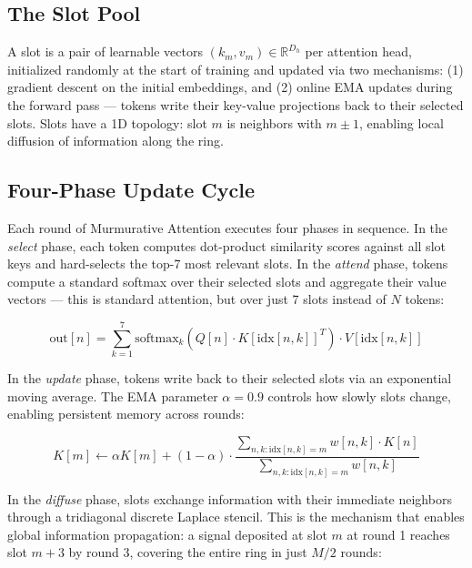 \documentclass{article}
\begin{document}
\subsection{The Slot Pool}

A slot is a pair of learnable vectors $(k_m, v_m) \in \mathbb{R}^{D_h}$ per attention head, initialized randomly at the start of training and updated via two mechanisms: (1) gradient descent on the initial embeddings, and (2) online EMA updates during the forward pass — tokens write their key-value projections back to their selected slots. Slots have a 1D topology: slot $m$ is neighbors with $m \pm 1$, enabling local diffusion of information along the ring.

\subsection{Four-Phase Update Cycle}

Each round of Murmurative Attention executes four phases in sequence. In the \textit{select} phase, each token computes dot-product similarity scores against all slot keys and hard-selects the top-7 most relevant slots. In the \textit{attend} phase, tokens compute a standard softmax over their selected slots and aggregate their value vectors — this is standard attention, but over just 7 slots instead of $N$ tokens:

\begin{equation}
\mathrm{out}[n] = \sum_{k=1}^{7} \mathrm{softmax}_k\!\left(Q[n] \cdot K[\mathrm{idx}[n,k]]^{T}\right) \cdot V[\mathrm{idx}[n,k]]
\label{eq:select-attend}
\end{equation}

In the \textit{update} phase, tokens write back to their selected slots via an exponential moving average. The EMA parameter $\alpha = 0.9$ controls how slowly slots change, enabling persistent memory across rounds:

\begin{equation}
K[m] \leftarrow \alpha K[m] + (1-\alpha) \cdot \frac{\sum_{n,k: \mathrm{idx}[n,k]=m} w[n,k] \cdot K[n]}{\sum_{n,k: \mathrm{idx}[n,k]=m} w[n,k]}
\label{eq:ema-update}
\end{equation}

In the \textit{diffuse} phase, slots exchange information with their immediate neighbors through a tridiagonal discrete Laplace stencil. This is the mechanism that enables global information propagation: a signal deposited at slot $m$ at round 1 reaches slot $m+3$ by round 3, covering the entire ring in just $M/2$ rounds:
\end{document}

